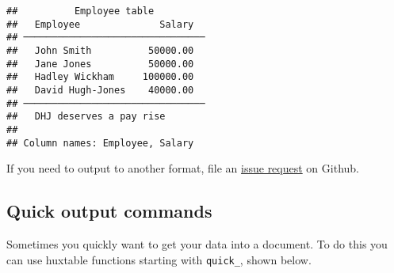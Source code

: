 \documentclass[]{article}
\begin{document}
\begin{verbatim}
##          Employee table         
##   Employee              Salary  
## ────────────────────────────────
##   John Smith          50000.00  
##   Jane Jones          50000.00  
##   Hadley Wickham     100000.00  
##   David Hugh-Jones    40000.00  
## ────────────────────────────────
##   DHJ deserves a pay rise       
## 
## Column names: Employee, Salary
\end{verbatim}

\FloatBarrier

If you need to output to another format, file an
\href{https://github.com/hughjonesd/huxtable}{issue request} on Github.

\hypertarget{quick-output-commands}{%
\subsection{Quick output commands}\label{quick-output-commands}}

Sometimes you quickly want to get your data into a document. To do this
you can use huxtable functions starting with \texttt{quick\_}, shown
below.
\end{document}

